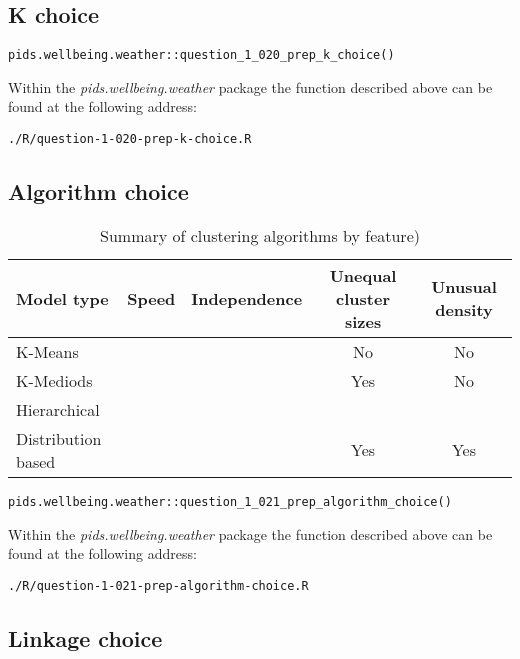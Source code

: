 \documentclass[12pt, oneside, openany]{book}
\begin{document}
\subsection*{ K choice}

\begin{verbatim}
pids.wellbeing.weather::question_1_020_prep_k_choice()
\end{verbatim}

Within the \emph{pids.wellbeing.weather} package the function described above can be found at the following address:

\begin{verbatim}
./R/question-1-020-prep-k-choice.R
\end{verbatim}

\subsection*{Algorithm choice}

\begin{table}[h!]
	\centering
	\begin{tabular}{ |l|c|c|c|c| }
		\hline
		Model type &  Speed & Independence & Unequal cluster sizes  & Unusual density   \\
		\hline
		\hline
		K-Means &   &   & No & No  \\
		K-Mediods &   &   &  Yes  & No  \\
		Hierarchical &  &   &   &  \\
		Distribution based &   &   & Yes  & Yes  \\
		\hline
	\end{tabular}
	\caption{Summary of clustering algorithms by feature)}
\end{table}

\begin{verbatim}
pids.wellbeing.weather::question_1_021_prep_algorithm_choice()
\end{verbatim}

Within the \emph{pids.wellbeing.weather} package the function described above can be found at the following address:

\begin{verbatim}
./R/question-1-021-prep-algorithm-choice.R
\end{verbatim}

\subsection*{Linkage choice}
\end{document}
